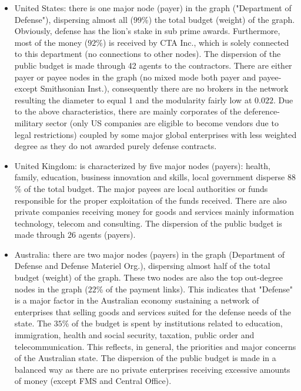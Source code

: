 \documentclass[1p,12pt]{elsarticle}
\begin{document}
\begin{itemize}
	\item United States: there is one major node (payer) in the graph ("Department of Defense"), dispersing almost all ($99$\%) the total budget (weight) of the graph. Obviously, defense has the lion's stake in sub prime awards. Furthermore, most of the money ($92$\%) is received by CTA Inc., which is solely connected to this department (no connections to other nodes). The dispersion of the public budget is made through 42 agents to the contractors. There are either payer or payee nodes in the graph (no mixed mode both payer and payee-except Smithsonian Inst.), consequently there are no brokers in the network resulting the diameter to equal 1 and the modularity fairly low at $0.022$. Due to the above characteristics, there are mainly corporates of the deference-military sector (only US companies are eligible to become vendors due to legal restrictions) coupled by some major global enterprises with less weighted degree as they do not awarded purely defense contracts.
	
	\item United Kingdom: is characterized by five major nodes (payers): health, family, education, business innovation and skills, local government disperse $88$\% of the total budget. The major payees are local authorities or funds responsible for the proper exploitation of the funds received. There are also private companies receiving money for goods and services mainly information technology, telecom and consulting. The dispersion of the public budget is made through 26 agents (payers). 
	
	\item Australia: there are two major nodes (payers) in the graph (Department of Defense and Defense Materiel Org.), dispersing almost half of the total budget (weight) of the graph. These two nodes are also the top out-degree nodes in the graph ($22$\% of the payment links). This indicates that "Defense" is a major factor in the Australian economy sustaining a network of enterprises that selling goods and services suited for the defense needs of the state. The $35$\% of the budget is spent by institutions related to education, immigration, health and social security, taxation, public order and telecommunication. This reflects, in general, the priorities and major concerns of the Australian state. The dispersion of the public budget is made in a balanced way as there are no private enterprises receiving excessive amounts of money (except FMS and Central Office).
	

\end{itemize}
\end{document}

